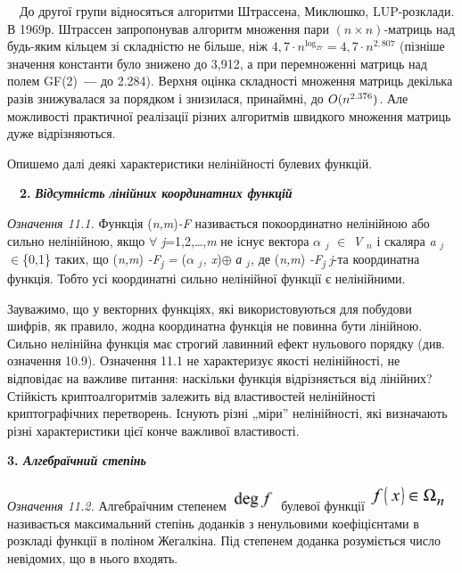 \ \ До другої групи відносяться алгоритми Штрассена, Миклюшко, LUP-розклади. В
1969р. Штрассен запропонував алгоритм множення пари  $(n\times n)${}-матриць
над будь-яким кільцем зі складністю не більше, ніж  ${4,7\cdot
n^{\log _{{2}7}}=4,7\cdot n^{2,\text{807}}}$ (пізніше значення константи
було знижено до 3,912, а при перемноженні матриць над полем
GF(2)\textbf{\textit{ --- }}до  2.284). Верхня оцінка складності множення матриць
декілька разів знижувалася за порядком і  знизилася, принаймні, до 
$O(n^{2\text{.}\text376})$. Але можливості практичної реалізації  різних
алгоритмів швидкого множення матриць дуже відрізняються. 

Опишемо далі деякі характеристики нелінійності булевих функцій.


\bigskip

\ \ \textbf{2. }\textbf{\textit{Відсутність}}\textbf{  }\textbf{\textit{лінійних
координатних функцій}}

 \textit{Означення 11.1.}\textit{ } Функція (\textit{n,m})\textit{{}-}\textit{F}
 називається покоординатно нелінійною або сильно нелінійною, якщо $\forall$
\textit{j}=1,2,…,\textit{m }не існує вектора $\alpha$ ${}_j$ $\in$
\textit{V} ${}_n$ і скаляра \textit{a} ${}_j$$\in$\{0,1\} таких,
що (\textit{n,m})\textit{ -F{\textbar}}\textit{\textsubscript{j}}\textit{ =}
(\textit{$\alpha$} ${}_j$\textit{, x})$\oplus$\textit{ }\textit{а}
${}_j$\textit{, }де (\textit{n,m})\textit{
-F{\textbar}}\textit{\textsubscript{j}} \textit{ }\textit{j}{}-та координатна
функція. Тобто усі координатні сильно нелінійної функції є нелінійними.

Зауважимо, що у векторних функціях, які використовуються для побудови шифрів, як
правило, жодна координатна функція не повинна бути лінійною. Сильно нелінійна
функція має строгий лавинний ефект нульового порядку (див. означення 10.9).
Означення 11.1 не характеризує якості нелінійності, не відповідає на важливе
питання:  наскільки функція відрізняється від лінійних? Стійкість
криптоалгоритмів залежить від властивостей нелінійності  криптографічних
перетворень.  Існують різні „міри” нелінійності, які визначають різні
характеристики цієї конче важливої властивості. 


\bigskip


\bigskip

{\bfseries
3.\textit{ Алгебраїчний степінь}}

 \textit{Означення 11.2.}\textit{ }Алгебраїчним степенем 
\includegraphics[width=0.5425in,height=0.2665in]{crypt-img/crypt-img256.png} 
булевої функції 
\includegraphics[width=0.9098in,height=0.3354in]{crypt-img/crypt-img257.png} 
називається максимальний степінь доданків з ненульовими коефіцієнтами в
розкладі функції в поліном Жегалкіна. Під степенем доданка розуміється число
невідомих, що в нього входять. 

